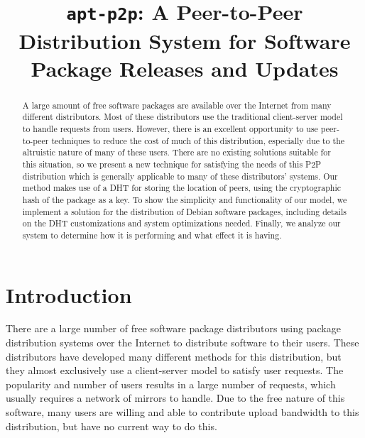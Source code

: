 \documentclass[conference]{IEEEtran}
\begin{document}
\title{\texttt{apt-p2p}: A Peer-to-Peer Distribution System for Software Package Releases and Updates}
\author{
\and
{}
}

\maketitle

\begin{abstract}
A large amount of free software packages are available over the
Internet from many different distributors. Most of these
distributors use the traditional client-server model to handle
requests from users. However, there is an excellent opportunity to
use peer-to-peer techniques to reduce the cost of much of this
distribution, especially due to the altruistic nature of many of
these users. There are no existing solutions suitable for this
situation, so we present a new technique for satisfying the needs of
this P2P distribution which is generally applicable to many of
these distributors' systems. Our method makes use of a DHT for
storing the location of peers, using the cryptographic hash of the
package as a key. To show the simplicity and functionality of our model, we
implement a solution for the distribution of Debian software
packages, including details on the DHT customizations and system optimizations needed. Finally, we
analyze our system to determine how it is performing and what effect
it is having.
\end{abstract}


\section{Introduction}
\label{intro}

There are a large number of free software package distributors using
package distribution systems over the Internet to distribute
software to their users. These distributors have developed many
different methods for this distribution, but they almost exclusively
use a client-server model to satisfy user requests. The popularity
and number of users results in a large number of requests, which
usually requires a network of mirrors to handle. Due to the free
nature of this software, many users are willing and able to
contribute upload bandwidth to this distribution, but have no
current way to do this.
\end{document}
